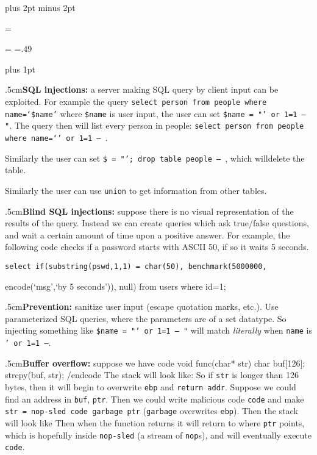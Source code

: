 
\parindent=0pt
\parskip=3pt plus 2pt minus 2pt


\newbox\columnbox
\output={\twocoloutput}

\newdimen\oldhsize \oldhsize=\hsize
\hsize=.49\hsize

\def\twocoloutput{
    \ifvoid\columnbox%
        \global\setbox\columnbox=\vtop{\unvbox255}%
    \else%
        \shipout\hbox to\oldhsize{\vtop{\box\columnbox}\hfill\vtop{\kern\z@\box255}}%
    \fi%
}


\setscale{8pt}
\baselineskip=1.5pt plus 1pt

\quitvmode\kern.5cm{\bf SQL injections:} a server making SQL query by client input can be exploited.
For example the query {\tt select person from people where name=\allowbreak`\$name'} where {\tt\$name} is user input, the user can set {\tt\$name = "' or 1=1 -- "}.
The query then will list every person in people: {\tt select person from people where name=`' or 1=1 -- }.

Similarly the user can set {\tt\$ = "'; drop table people -- }, which will\hfill\break delete the table.

Similarly the user can use {\tt union} to get information from other tables.

\quitvmode\kern.5cm{\bf Blind SQL injections:} suppose there is no visual representation of the results of the query.
Instead we can create queries which ask true/false questions, and wait a certain amount of time upon a positive answer.
For example, the following code checks if a password starts with ASCII 50, if so it waits 5 seconds.

{\tt select if(substring(pswd,1,1) = char(50), benchmark(5000000,

encode(`msg',`by 5 seconds')), null) from users where id=1;}

\quitvmode\kern.5cm{\bf Prevention:} sanitize user input (escape quotation marks, etc.).
Use parameterized SQL queries, where the parameters are of a set datatype.
So injecting something like {\tt\$name = "' or 1=1 -- "} will match {\it literally} when {\tt name} is {\tt' or 1=1 --}.

\quitvmode\kern.5cm{\bf Buffer overflow:} suppose we have code
\begincode
void func(char* str) {
    char buf[126];
    strcpy(buf, str);
}
/endcode
The stack will look like:
So if {\tt str} is longer than 126 bytes, then it will begin to overwrite {\tt ebp} and {\tt return addr}.
Suppose we could find an address in {\tt buf}, {\tt ptr}.
Then we could write malicious code {\tt code} and make {\tt str = nop-sled\ code\ garbage\ ptr} ({\tt garbage} overwrites {\tt ebp}).
Then the stack will look like
Then when the function returns it will return to where {\tt ptr} points, which is hopefully inside {\tt nop-sled} (a stream of {\tt nop}s), and will eventually execute {\tt code}.

